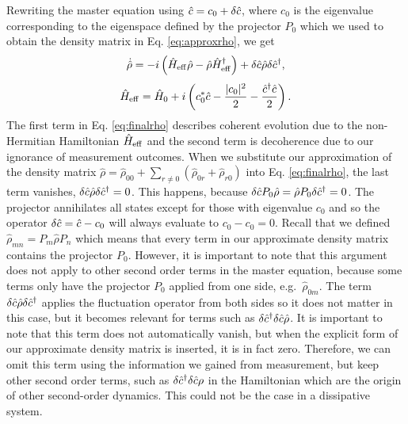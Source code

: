 Rewriting the master equation using $\hat{c} = c_0 + \delta \hat{c}$, where
$c_0$ is the eigenvalue corresponding to the eigenspace defined by the
projector $P_0$ which we used to obtain the density matrix in
Eq. \eqref{eq:approxrho}, we get
\begin{equation}
  \label{eq:finalrho}
  \dot{\hat{\rho}} = -i \left( \hat{H}_\mathrm{eff} \hat{\rho} - \hat{\rho}
  \hat{H}_\mathrm{eff}^\dagger \right) + \delta \hat{c} \hat{\rho} \delta \hat{c}^\dagger,
\end{equation}
\begin{equation}
  \label{eq:Ham}
  \hat{H}_\mathrm{eff} = \hat{H}_0 + i \left( c_0^*\hat{c} - \frac{|c_0|^2}{2} - \frac{\hat{c}^\dagger\hat{c}}{2} \right).
\end{equation}
The first term in Eq. \eqref{eq:finalrho} describes coherent evolution
due to the non-Hermitian Hamiltonian $\hat{H}_\mathrm{eff}$ and the second
term is decoherence due to our ignorance of measurement outcomes. When
we substitute our approximation of the density matrix
$\hat{\rho} = \hat{\rho}_{00} + \sum_{r\ne0} (\hat{\rho}_{0r} +
\hat{\rho}_{r0})$ into Eq. \eqref{eq:finalrho}, the last term
vanishes, $\delta \hat{c} \hat{\rho} \delta \hat{c}^\dagger = 0$. This happens, because
$\delta \hat{c} P_0 \hat{\rho} = \hat{\rho} P_0 \delta \hat{c}^\dagger = 0$. The
projector annihilates all states except for those with eigenvalue
$c_0$ and so the operator $\delta \hat{c} = \hat{c} - c_0$ will always evaluate
to $c_0 - c_0 = 0$. Recall that we defined
$\hat{\rho}_{mn} = P_m \hat{\rho} P_n$ which means that every term in
our approximate density matrix contains the projector $P_0$. However,
it is important to note that this argument does not apply to other
second order terms in the master equation, because some terms only
have the projector $P_0$ applied from one side,
e.g.~$\hat{\rho}_{0m}$. The term $\delta \hat{c} \hat{\rho} \delta \hat{c}^\dagger$
applies the fluctuation operator from both sides so it does not matter
in this case, but it becomes relevant for terms such as
$\delta \hat{c}^\dagger \delta \hat{c} \hat{\rho}$. It is important to note that this
term does not automatically vanish, but when the explicit form of our
approximate density matrix is inserted, it is in fact zero. Therefore,
we can omit this term using the information we gained from
measurement, but keep other second order terms, such as
$\delta \hat{c}^\dagger \delta \hat{c} \rho$ in the Hamiltonian which are the origin of
other second-order dynamics. This could not be the case in a
dissipative system.

